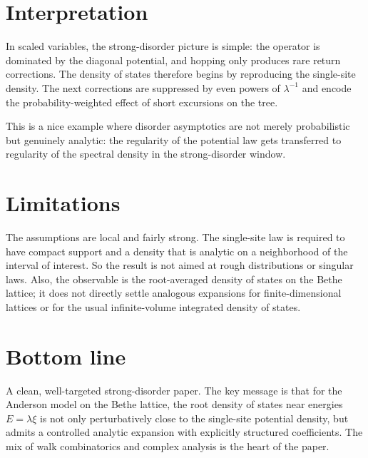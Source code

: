 \documentclass[11pt]{article}
\begin{document}
\section*{Interpretation}
In scaled variables, the strong-disorder picture is simple: the operator is dominated by the diagonal potential, and hopping only produces rare return corrections. The density of states therefore begins by reproducing the single-site density. The next corrections are suppressed by even powers of $\lambda^{-1}$ and encode the probability-weighted effect of short excursions on the tree.

This is a nice example where disorder asymptotics are not merely probabilistic but genuinely analytic: the regularity of the potential law gets transferred to regularity of the spectral density in the strong-disorder window.
\section*{Limitations}
The assumptions are local and fairly strong. The single-site law is required to have compact support and a density that is analytic on a neighborhood of the interval of interest. So the result is not aimed at rough distributions or singular laws. Also, the observable is the root-averaged density of states on the Bethe lattice; it does not directly settle analogous expansions for finite-dimensional lattices or for the usual infinite-volume integrated density of states.
\section*{Bottom line}
A clean, well-targeted strong-disorder paper. The key message is that for the Anderson model on the Bethe lattice, the root density of states near energies $E=\lambda\xi$ is not only perturbatively close to the single-site potential density, but admits a controlled analytic expansion with explicitly structured coefficients. The mix of walk combinatorics and complex analysis is the heart of the paper.
\end{document}
